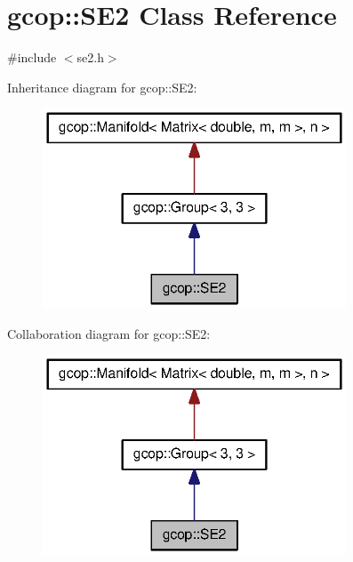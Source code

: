 \section{gcop\-:\-:\-S\-E2 \-Class \-Reference}
\label{classgcop_1_1SE2}


{\ttfamily \#include $<$se2.\-h$>$}



\-Inheritance diagram for gcop\-:\-:\-S\-E2\-:\nopagebreak
\begin{figure}[H]
\begin{center}
\leavevmode
\includegraphics[width=256pt]{classgcop_1_1SE2__inherit__graph}
\end{center}
\end{figure}


\-Collaboration diagram for gcop\-:\-:\-S\-E2\-:\nopagebreak
\begin{figure}[H]
\begin{center}
\leavevmode
\includegraphics[width=256pt]{classgcop_1_1SE2__coll__graph}
\end{center}
\end{figure}

